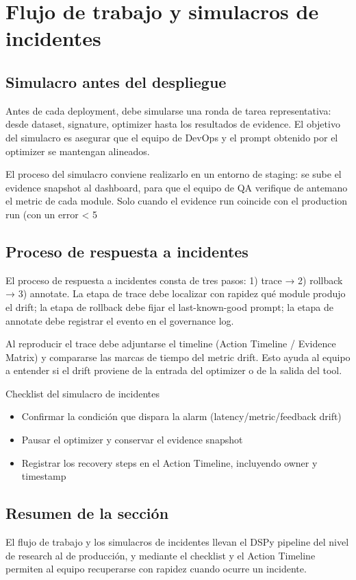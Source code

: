 \section{Flujo de trabajo y simulacros de incidentes}

\subsection{Simulacro antes del despliegue}

Antes de cada deployment, debe simularse una ronda de tarea representativa: desde dataset, signature, optimizer hasta los resultados de evidence. El objetivo del simulacro es asegurar que el equipo de DevOps y el prompt obtenido por el optimizer se mantengan alineados.

El proceso del simulacro conviene realizarlo en un entorno de staging: se sube el evidence snapshot al dashboard, para que el equipo de QA verifique de antemano el metric de cada module. Solo cuando el evidence run coincide con el production run (con un error < 5 %

\subsection{Proceso de respuesta a incidentes}

El proceso de respuesta a incidentes consta de tres pasos: 1) trace → 2) rollback → 3) annotate. La etapa de trace debe localizar con rapidez qué module produjo el drift; la etapa de rollback debe fijar el last-known-good prompt; la etapa de annotate debe registrar el evento en el governance log.

Al reproducir el trace debe adjuntarse el timeline (Action Timeline / Evidence Matrix) y compararse las marcas de tiempo del metric drift. Esto ayuda al equipo a entender si el drift proviene de la entrada del optimizer o de la salida del tool.

\begin{importantbox}{Checklist del simulacro de incidentes}
\begin{itemize}
    \item Confirmar la condición que dispara la alarm (latency/metric/feedback drift)
    \item Pausar el optimizer y conservar el evidence snapshot
    \item Registrar los recovery steps en el Action Timeline, incluyendo owner y timestamp
\end{itemize}
\end{importantbox}

\subsection{Resumen de la sección}

El flujo de trabajo y los simulacros de incidentes llevan el DSPy pipeline del nivel de research al de producción, y mediante el checklist y el Action Timeline permiten al equipo recuperarse con rapidez cuando ocurre un incidente.
